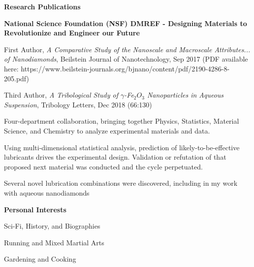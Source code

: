 \documentclass[letterpaper,final]{memoir}
\newcommand{\Sep}{\vspace{1.0em}}
\newcommand{\SmallSep}{\vspace{0.4em}}
\newcommand{\CVSection}[1]
	{\LARGE\textbf{#1}\par
	\SmallSep\normalsize}
\newcommand{\CVItem}[1]
	{\textbf{\color{Blue} #1}}
\begin{document}

\notoserif \CVSection{Research Publications}
\normalfont

\SmallSep
\CVItem{National Science Foundation (NSF) DMREF - Designing Materials to Revolutionize and Engineer our Future} 
\SmallSep

\begin{compactitem}[\color{Blue}$\circ$]
	 
    \item First Author, \textit{A Comparative Study of the Nanoscale and Macroscale Attributes... of Nanodiamonds}, Beilstein Journal of Nanotechnology, Sep 2017 (PDF available here: https://www.beilstein-journals.org/bjnano/content/pdf/2190-4286-8-205.pdf)
    \SmallSep

\item Third Author, \textit{A Tribological Study of $\gamma$-Fe$_{2}O_{3}$ Nanoparticles in Aqueous Suspension}, Tribology Letters, Dec 2018 (66:130)
    \SmallSep

    \item Four-department collaboration, bringing together Physics, Statistics, Material Science, and Chemistry to analyze experimental
            materials and data. 
    \SmallSep

    \item Using multi-dimensional statistical analysis, prediction of likely-to-be-effective lubricants drives the experimental design.
            Validation or refutation of that proposed next material was conducted and the cycle perpetuated. 
    \SmallSep
            
    \item Several novel lubrication combinations were discovered, including in my
            work with aqueous nanodiamonds
	
\end{compactitem}

\Sep
\newpage
\notoserif \CVSection{Personal Interests}
\normalfont

\begin{multicols}{3}
	\begin{compactitem}
		
		\item Sci-Fi, History, and Biographies
		\item Running and Mixed Martial Arts
        \item Gardening and Cooking
			
	\end{compactitem}
\end{multicols}
\end{document}
